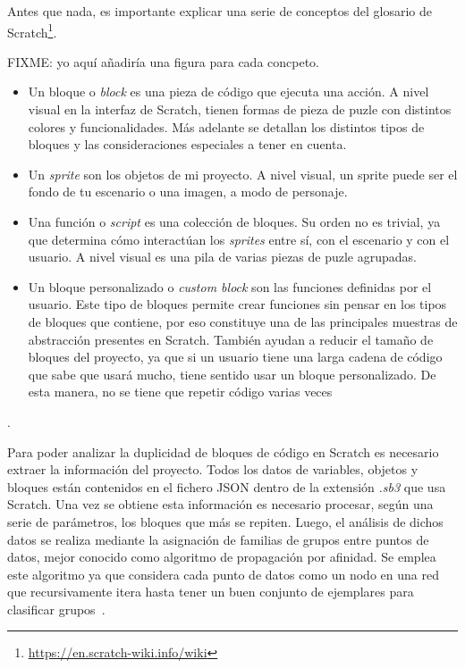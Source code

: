 \documentclass[a4paper, 12pt]{book}
\begin{document}
Antes que nada, es importante explicar una serie de conceptos del glosario de Scratch\footnote{\url{https://en.scratch-wiki.info/wiki}}. 

FIXME: yo aquí añadiría una figura para cada concpeto.

\begin{itemize}
 \item Un bloque o \textit{block} es una pieza de código que ejecuta una acción. A nivel visual en la interfaz de Scratch, tienen formas de pieza de puzle con distintos colores y funcionalidades. Más adelante se detallan los distintos tipos de bloques y las consideraciones especiales a tener en cuenta. 
 \item Un \textit{sprite} son los objetos de mi proyecto. A nivel visual, un sprite puede ser el fondo de tu escenario o una imagen, a modo de personaje.
 \item Una función o \textit{script} es una colección de bloques. Su orden no es trivial, ya que determina cómo interactúan los \textit{sprites} entre sí, con el escenario y con el usuario. A nivel visual es una pila de varias piezas de puzle agrupadas.
 \item Un bloque personalizado o \textit{custom block} son las funciones definidas por el usuario. Este tipo de bloques permite crear funciones sin pensar en los tipos de bloques que contiene, por eso constituye una de las principales muestras de abstracción presentes en Scratch. También ayudan a reducir el tamaño de bloques del proyecto, ya que si un usuario tiene una larga cadena de código que sabe que usará mucho, tiene sentido usar un bloque personalizado. De esta manera, no se tiene que repetir código varias veces~\cite{scratchWeb}
\end{itemize}.

Para poder analizar la duplicidad de bloques de código en Scratch es necesario extraer la información del proyecto. Todos los datos de variables, objetos y bloques están contenidos en el fichero JSON dentro de la extensión \emph{.sb3} que usa Scratch. Una vez se obtiene esta información es necesario procesar, según una serie de parámetros, los bloques que más se repiten. Luego, el análisis de dichos datos se realiza mediante la asignación de familias de grupos entre puntos de datos, mejor conocido como algoritmo de propagación por afinidad. Se emplea este algoritmo ya que considera cada punto de datos como un nodo en una red que recursivamente itera hasta tener un buen conjunto de ejemplares para clasificar grupos~\cite{clusteringpaper}.
\end{document}
